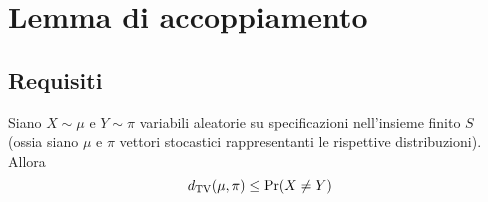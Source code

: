 %
%
%
%


\section{Lemma di accoppiamento}


\subsection{Requisiti}
\begin{prop}\label{prop:neqvar}
	Siano $X\sim\mu$ e $Y\sim\pi$ variabili aleatorie su specificazioni nell'insieme finito $S$ (ossia siano $\mu$ e $\pi$ vettori stocastici rappresentanti le rispettive distribuzioni). Allora
	\begin{equation*}
		d_{\mathrm{TV}}(\mu,\pi)\le\mathrm{Pr}(X\ne Y)
	\end{equation*}
\end{prop}



